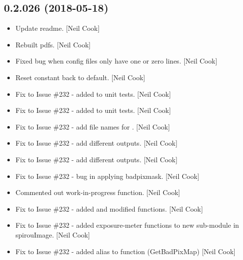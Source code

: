 \documentclass[a4paper,10pt,english]{report}
\begin{document}
\subsection{0.2.026 (2018-05-18)}
\label{\detokenize{misc/changelog:id434}}\begin{itemize}
\item {} 
Update readme. {[}Neil Cook{]}

\item {} 
Rebuilt pdfs. {[}Neil Cook{]}

\item {} 
Fixed bug when config files only have one or zero lines. {[}Neil Cook{]}

\item {} 
Reset constant back to default. {[}Neil Cook{]}

\item {} 
Fix to Issue \#232 - added  to unit tests. {[}Neil
Cook{]}

\item {} 
Fix to Issue \#232 - added  to unit tests. {[}Neil
Cook{]}

\item {} 
Fix to Issue \#232 - add file names for . {[}Neil Cook{]}

\item {} 
Fix to Issue \#232 - add different outputs. {[}Neil Cook{]}

\item {} 
Fix to Issue \#232 - add different outputs. {[}Neil Cook{]}

\item {} 
Fix to Issue \#232 - bug in applying badpixmask. {[}Neil Cook{]}

\item {} 
Commented out work-in-progress function. {[}Neil Cook{]}

\item {} 
Fix to Issue \#232 - added  and modified
 functions. {[}Neil Cook{]}

\item {} 
Fix to Issue \#232 - added exposure-meter functions to new sub-module
in spirouImage. {[}Neil Cook{]}

\item {} 
Fix to Issue \#232 - added alias to  function
(GetBadPixMap) {[}Neil Cook{]}


\end{itemize}
\end{document}
